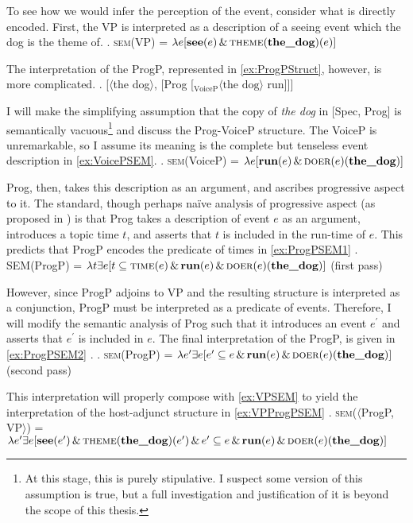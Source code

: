 \documentclass[MilwayThesis]{subfiles}
\begin{document}
To see how we would infer the perception of the event, consider what is directly encoded.
First, the VP is interpreted as a description of a seeing event which the dog is the theme of.
\ex.\label{ex:VPSEM} \textsc{sem}(VP) = $\lambda e [\textbf{see}(e)\,\&\,\textsc{theme}(\textbf{the\_dog})(e)]$

The interpretation of the ProgP, represented in \cref{ex:ProgPStruct}, however, is more complicated.
\ex.\label{ex:ProgPStruct} [$\langle$the dog$\rangle$, [Prog [$_\text{VoiceP} \langle\text{the dog}\rangle$ run]]]

I will make the simplifying assumption that the copy of \textit{the dog} in [Spec, Prog] is semantically vacuous\footnote{
	At this stage, this is purely stipulative.
	I suspect some version of this assumption is true, but a full investigation and justification of it is beyond the scope of this thesis.
} and discuss the Prog-VoiceP structure.
The VoiceP is unremarkable, so I assume its meaning is the complete but tenseless event description in \cref{ex:VoicePSEM}.
\ex.\label{ex:VoicePSEM} \textsc{sem}(VoiceP) = $\lambda e [\textbf{run}(e)\,\&\,\textsc{doer}(e)(\textbf{the\_dog})]$

Prog, then, takes this description as an argument, and ascribes progressive aspect to it.
The standard, though perhaps na\"ive analysis of progressive aspect (as proposed in \cite{klein1994time}) is that Prog takes a description of event $e$ as an argument, introduces a topic time $t$, and asserts that $t$ is included in the run-time of $e$.
This predicts that ProgP encodes the predicate of times in \cref{ex:ProgPSEM1}
\ex.\label{ex:ProgPSEM1} \textsc{SEM}(ProgP) =  $\lambda t \exists e [t \subseteq \textsc{time}(e)\,\&\,\textbf{run}(e)\,\&\,\textsc{doer}(e)(\textbf{the\_dog})]$ (first pass)

However, since ProgP adjoins to VP and the resulting structure is interpreted as a conjunction, ProgP must be interpreted as a predicate of events.
Therefore, I will modify the semantic analysis of Prog such that it introduces an event $e^{\prime}$ and asserts that $e^{\prime}$ is included in $e$.
The final interpretation of the ProgP, is given in \cref{ex:ProgPSEM2} \parencite[cf.][]{bjorkman2018poster}.
\ex.\label{ex:ProgPSEM2} \textsc{sem}(ProgP) =  $\lambda e^{\prime} \exists e [e^{\prime} \subseteq e\,\&\,\textbf{run}(e)\,\&\,\textsc{doer}(e)(\textbf{the\_dog})]$ (second pass)

This interpretation will properly compose with \cref{ex:VPSEM} to yield the interpretation of the host-adjunct structure in \cref{ex:VPProgPSEM}
\ex.\label{ex:VPProgPSEM} \textsc{sem}($\langle$ProgP, VP$\rangle$) = $\lambda e^{\prime} \exists e [ \textbf{see}(e^{\prime})\,\&\,\textsc{theme}(\textbf{the\_dog})(e^{\prime})\,\&\,e^{\prime} \subseteq e\,\&\,\textbf{run}(e)\,\&\,\textsc{doer}(e)(\textbf{the\_dog})]$
\end{document}
